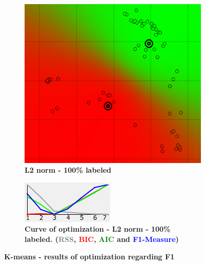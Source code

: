 \begin{figure}[h]
\begin{subfigure}[h]{0.25\textwidth}
    \includegraphics[height=0.15\textheight]{./clustering/opt_F1_100__k_mean_L2_range7.png}
	\caption{\bf L2 norm - 100\% labeled}
    \label{fig:figure11b}
    \end{subfigure}
    \hspace{20mm}
    \begin{subfigure}[h]{0.50\textwidth}
    \centering
    \includegraphics[height=0.15\textheight]{./clustering/curve_opt_F1_100__k_mean_L2_range7.png}
	\caption{\bf Curve of optimization - L2 norm - 100\% labeled. (\textcolor{gray}{RSS}, \textcolor{red}{BIC}, \textcolor{green}{AIC} and \textcolor{blue}{F1-Measure})}
    \label{fig:figure11d}
    \end{subfigure}
\caption{\bf K-means - results of optimization regarding F1}
\label{fig:figure11}
\end{figure}


